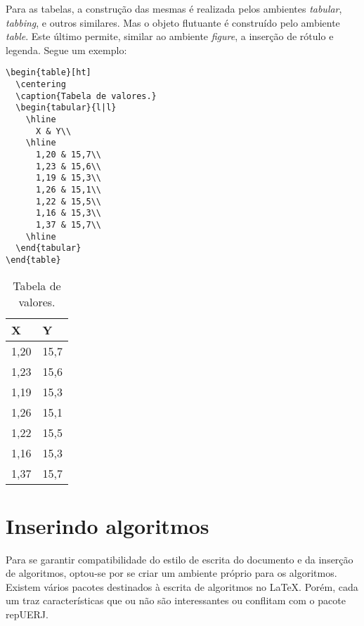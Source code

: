 \documentclass[a4paper,12pt,oneside,onecolumn]{article}
\newcommand{\repUERJ}{\textsf{repUERJ}}
\begin{document}
Para as tabelas, a construção das mesmas é realizada pelos ambientes \textsl{tabular}, \textsl{tabbing}, e outros similares. Mas o objeto flutuante é construído pelo ambiente \textsl{table}. Este último permite, similar ao ambiente \textsl{figure}, a inserção de rótulo e legenda. Segue um exemplo:

\begin{verbatim}
\begin{table}[ht]
  \centering
  \caption{Tabela de valores.}
  \begin{tabular}{l|l}
    \hline
      X & Y\\
    \hline
      1,20 & 15,7\\
      1,23 & 15,6\\
      1,19 & 15,3\\
      1,26 & 15,1\\
      1,22 & 15,5\\
      1,16 & 15,3\\
      1,37 & 15,7\\
    \hline
  \end{tabular}
\end{table}
\end{verbatim}

\begin{table}[ht]
  \centering
  \caption{Tabela de valores.}
  \begin{tabular}{l|l}
    \hline
      X & Y\\
    \hline
      1,20 & 15,7\\
      1,23 & 15,6\\
      1,19 & 15,3\\
      1,26 & 15,1\\
      1,22 & 15,5\\
      1,16 & 15,3\\
      1,37 & 15,7\\
    \hline
  \end{tabular}
\end{table}

\section{Inserindo algoritmos}

Para se garantir compatibilidade do estilo de escrita do documento e da inserção de algoritmos, optou-se por se criar um ambiente próprio para os algoritmos. Existem vários pacotes destinados à escrita de algoritmos no \LaTeX. Porém, cada um traz características que ou não são interessantes ou conflitam com o pacote \repUERJ.
\end{document}
